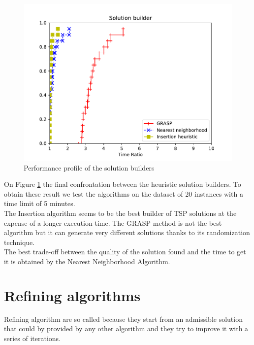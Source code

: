 \begin{figure}[h!]
	\centering
	\includegraphics[scale=0.8]{media/builder.pdf}
	\caption{Performance profile of the solution builders}
	\label{fig:solbuilder}
\end{figure}
\noindent
On Figure \ref{fig:solbuilder} the final confrontation between the heuristic solution builders. To obtain these result we test the algorithms on the dataset of 20 instances with a time limit of 5 minutes. \\
The Insertion algorithm seems to be the best builder of TSP solutions at the expense of a longer execution time. The GRASP method is not the best algorithm but it can generate very different solutions thanks to its randomization technique. 
\\The best trade-off between the quality of the solution found and the time to get it is obtained by the Nearest Neighborhood Algorithm.

\clearpage

\section{Refining algorithms}
Refining algorithm are so called because they start from an admissible solution that could by provided by any other algorithm and they try to improve it with a series of iterations.

